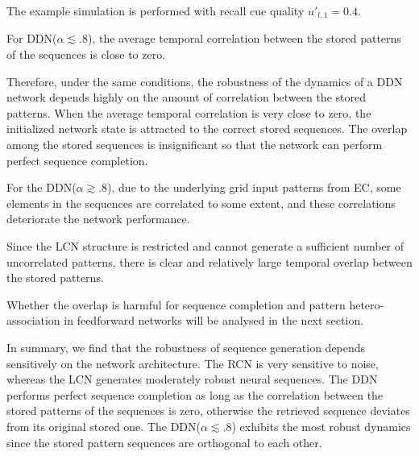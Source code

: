 \documentclass[utf8]{frontiersSCNS} %
\begin{document}
The example simulation is performed with recall cue quality $u'_{l, 1} = 0.4$. 

For DDN($\alpha \lesssim .8$), the average temporal correlation between the stored patterns of the sequences is close to zero. 

Therefore, under the same conditions, the robustness of the dynamics of a DDN network depends highly on the amount of correlation between the stored patterns. When the average temporal correlation is very close to zero, the initialized network state is attracted to the correct stored sequences. The overlap among the stored sequences is insignificant so that the network can perform perfect sequence completion.

%
For the DDN($\alpha \gtrsim .8$), due to the underlying grid input patterns from EC, some elements in the sequences are correlated to some extent, and these correlations deteriorate the network performance.


Since the LCN structure is restricted and cannot generate a sufficient number of uncorrelated patterns, there is clear and relatively large temporal overlap between the stored patterns. 

Whether the overlap is harmful for sequence completion and pattern hetero-association in feedforward networks will be analysed in the next section. 

In summary, we find that the robustness of sequence generation depends sensitively on the network architecture. The RCN is very sensitive to noise, whereas the LCN generates moderately robust neural sequences. The DDN performs perfect sequence completion as long as the correlation between the stored patterns of the sequences is zero, otherwise the retrieved sequence deviates from its original stored one. The DDN($\alpha \lesssim .8$) exhibits the most robust dynamics since the stored pattern sequences are orthogonal to each other.
\end{document}
